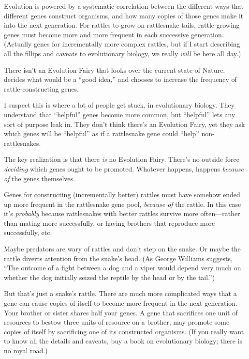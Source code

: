 {
 Evolution is powered by a systematic correlation between the
different ways that different genes construct organisms, and how many
copies of those genes make it into the next generation. For rattles to
grow on rattlesnake tails, rattle-growing genes must become more and
more frequent in each successive generation. (Actually genes for
incrementally more complex rattles, but if I start describing all the
fillips and caveats to evolutionary biology, we really \textit{will} be
here all day.)}

{
 There isn't an Evolution Fairy that looks over the
current state of Nature, decides what would be a
``good idea,'' and chooses to
increase the frequency of rattle-constructing genes.}

{
 I suspect this is where a lot of people get stuck, in evolutionary
biology. They understand that
``helpful'' genes become more
common, but ``helpful'' lets any
sort of purpose leak in. They don't think
there's an Evolution Fairy, yet they ask which genes
will be ``helpful'' as if a
rattlesnake gene could ``help''
non-rattlesnakes.}

{
 The key realization is that there \textit{is} no Evolution Fairy.
There's no outside force \textit{deciding} which genes
ought to be promoted. Whatever happens, happens \textit{because of} the
genes themselves.}

{
 Genes for constructing (incrementally better) rattles must have
somehow ended up more frequent in the rattlesnake gene pool,
\textit{because of} the rattle. In this case it's
\textit{probably} because rattlesnakes with better rattles survive more
often---rather than mating more successfully, or having brothers that
reproduce more successfully, etc.}

{
 Maybe predators are wary of rattles and don't step
on the snake. Or maybe the rattle diverts attention from the
snake's head. (As George Williams suggests,
``The outcome of a fight between a dog and a viper
would depend very much on whether the dog initially seized the reptile
by the head or by the tail.'')}

{
 But that's just a snake's rattle.
There are much more complicated ways that a gene can cause copies of
itself to become more frequent in the next generation. Your brother or
sister shares half your genes. A gene that sacrifices one unit of
resources to bestow three units of resource on a brother, may promote
some copies of itself by sacrificing one of its constructed organisms.
(If you really want to know all the details and caveats, buy a book on
evolutionary biology; there is no royal road.)}

